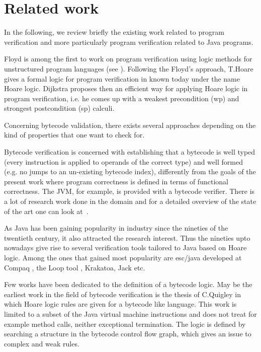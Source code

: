 \section{Related work} \label{relWorkWp}

In the following, we review briefly the existing work related to program verification
 and more particularly program verification related to Java programs. 


 Floyd is among the first to work on program verification using logic methods for unstructured program
 languages (see \cite{F67amp}). Following the Floyd's approach, T.Hoare gives a formal logic for program verification in \cite{Hoare69ABC} known
 today under the name Hoare logic. Dijkstra \cite{WPCDS} proposes then an efficient way for applying Hoare logic in
 program verification, i.e. he comes up with a weakest precondition (wp) and strongest postcondition (sp) calculi. 

Concerning bytecode validation, there exists several approaches depending on the kind of properties that one want to check for.
 
 Bytecode verification is concerned with establishing that a bytecode is well typed 
(every instruction is applied to operands of the correct type) and well formed 
(e.g. no jumps to an un-existing bytecode index), differently from the goals of the present
work where program correctness is defined in terms of functional correctness. The JVM, for example, 
is provided with a bytecode verifier. There is a lot of research work done in the domain 
and for a detailed overview of the state of the art one can look at~\cite{Ljbc}.  

As Java has been gaining popularity in industry since the nineties of the twentieth century,
it also attracted the research interest.   
Thus the nineties upto nowadays give rise to several verification tools tailored to Java
 based on Hoare logic. Among the ones that gained most popularity are
esc/java developed at Compaq \cite{escjava}, the Loop tool \cite{jacobs03java}, Krakatoa, Jack \cite{BRL-JACK} etc.   

Few works have been dedicated to the definition of a bytecode logic. May be the earliest work in the field of bytecode verification 
is the thesis of C.Quigley  \cite{Quigley03PLJ} in which Hoare logic rules are given for a bytecode like language. This work is limited 
to a subset of the Java virtual machine instructions and does not treat for example method calls,
 neither exceptional termination. The logic is defined by searching a structure in the bytecode control flow graph,
 which gives an issue to complex and weak rules.


